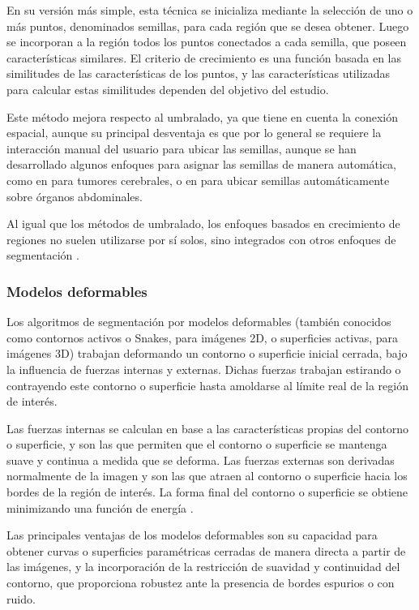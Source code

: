 En su versión más simple, esta técnica se inicializa mediante la selección de uno o más puntos, denominados semillas, para cada región que se desea obtener. Luego se incorporan a la región todos los puntos conectados a cada semilla, que poseen características similares. El criterio de crecimiento es una función basada en las similitudes de las características de los puntos, y las características utilizadas para calcular estas similitudes dependen del objetivo del estudio.

Este método mejora respecto al umbralado, ya que tiene en cuenta la conexión espacial, aunque su principal desventaja es que por lo general se requiere la interacción manual del usuario para ubicar las semillas, aunque se han desarrollado algunos enfoques para asignar las semillas de manera automática, como en \citep{kumar2011texture} para tumores cerebrales, o en \citep{wu2008segmentation} para ubicar semillas automáticamente sobre órganos abdominales.

Al igual que los métodos de umbralado, los enfoques basados en crecimiento de regiones no suelen utilizarse por sí solos, sino integrados con otros enfoques de segmentación \citep{freixenet2002yet}.

\subsubsection{Modelos deformables}
Los algoritmos de segmentación por modelos deformables (también conocidos como contornos activos o Snakes, para imágenes 2D, o superficies activas, para imágenes 3D) trabajan deformando un contorno o superficie inicial cerrada, bajo la influencia de fuerzas internas y externas. Dichas fuerzas trabajan estirando o contrayendo este contorno o superficie hasta amoldarse al límite real de la región de interés.

Las fuerzas internas se calculan en base a las características propias del contorno o superficie, y son las que permiten que el contorno o superficie se mantenga suave y continua a medida que se deforma.  Las fuerzas externas son derivadas normalmente de la imagen y son las que atraen al contorno o superficie hacia los bordes de la región de interés. La forma final del contorno o superficie se obtiene minimizando una función de energía \citep{pham2000current}.

Las principales ventajas de los modelos deformables son su capacidad para obtener curvas o superficies paramétricas cerradas de manera directa a partir de las imágenes, y la incorporación de la restricción de suavidad y continuidad del contorno, que proporciona robustez ante la presencia de bordes espurios o con ruido.

